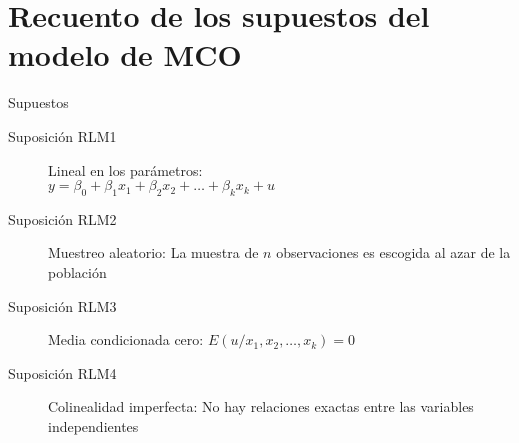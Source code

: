 \section[Supuestos MCO]{Recuento de los supuestos del modelo de MCO}
\begin{frame}{Supuestos}
	\begin{description}
		\item[Suposición RLM1] Lineal en los parámetros:\\ 			$y=\beta_{0}+\beta_{1}x_{1}+\beta_{2}x_{2}+ \ldots +\beta_{k}x_{k}+u$
		\item[Suposición RLM2] Muestreo aleatorio: La muestra de $n$ observaciones es escogida al azar de la población
		\item[Suposición RLM3] Media condicionada cero: $E(u/x_{1},x_{2}, \ldots ,x_{k})=0$
		\item[Suposición RLM4] Colinealidad imperfecta: No hay relaciones exactas entre las variables independientes
	\end{description}
\end{frame}